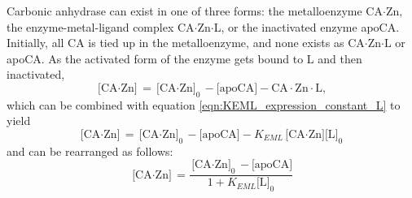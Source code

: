 Carbonic anhydrase can exist in one of three forms: the metalloenzyme CA$\cdot$Zn, the enzyme-metal-ligand complex CA$\cdot$Zn$\cdot$L, or the inactivated enzyme apoCA. Initially, all CA is tied up in the metalloenzyme, and none exists as CA$\cdot$Zn$\cdot$L or apoCA. As the activated form of the enzyme gets bound to L and then inactivated,
\begin{equation}\label{eqn:CAZnconc}
\text{[CA$\cdot$Zn]}=\text{[CA$\cdot$Zn]}_0 - \text{[apoCA]} - \text{CA$\cdot$Zn$\cdot$L},
\end{equation}
which can be combined with equation \eqref{eqn:KEML_expression_constant_L} to yield
\begin{equation}\label{eqn:CAZnconc_EMLsub}
\text{[CA$\cdot$Zn]}=\text{[CA$\cdot$Zn]}_0 - \text{[apoCA]} - K_{EML}\text{[CA$\cdot$Zn][L]}_0
\end{equation}
and can be rearranged as follows:
\begin{equation}\label{eqn:CAZnconc_EMLsub_rearrange}
\text{[CA$\cdot$Zn]}=\frac{\text{[CA$\cdot$Zn]}_0 - \text{[apoCA]}}{1+K_{EML}\text{[L]}_0}
\end{equation}

